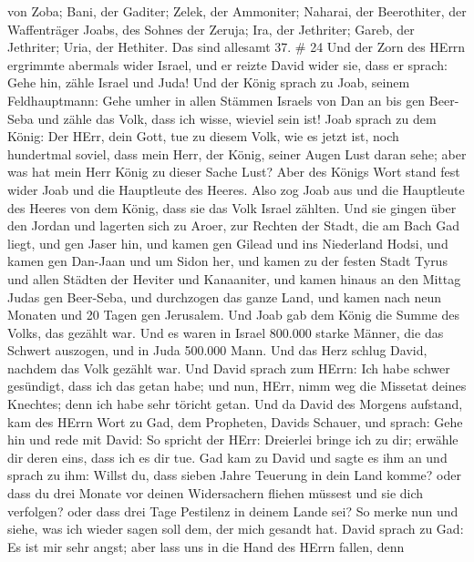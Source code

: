 von Zoba; Bani, der Gaditer;  Zelek, der Ammoniter;
Naharai, der Beerothiter, der Waffenträger Joabs, des Sohnes der Zeruja;
 Ira, der Jethriter; Gareb, der Jethriter; 
Uria, der Hethiter. Das sind allesamt 37. \# 24  Und der
Zorn des HErrn ergrimmte abermals wider Israel, und er reizte David
wider sie, dass er sprach: Gehe hin, zähle Israel und Juda! 
Und der König sprach zu Joab, seinem Feldhauptmann: Gehe umher in allen
Stämmen Israels von Dan an bis gen Beer-Seba und zähle das Volk, dass
ich wisse, wieviel sein ist!  Joab sprach zu dem König: Der
HErr, dein Gott, tue zu diesem Volk, wie es jetzt ist, noch hundertmal
soviel, dass mein Herr, der König, seiner Augen Lust daran sehe; aber
was hat mein Herr König zu dieser Sache Lust?  Aber des
Königs Wort stand fest wider Joab und die Hauptleute des Heeres. Also
zog Joab aus und die Hauptleute des Heeres von dem König, dass sie das
Volk Israel zählten.  Und sie gingen über den Jordan und
lagerten sich zu Aroer, zur Rechten der Stadt, die am Bach Gad liegt,
und gen Jaser hin,  und kamen gen Gilead und ins Niederland
Hodsi, und kamen gen Dan-Jaan und um Sidon her,  und kamen
zu der festen Stadt Tyrus und allen Städten der Heviter und Kanaaniter,
und kamen hinaus an den Mittag Judas gen Beer-Seba,  und
durchzogen das ganze Land, und kamen nach neun Monaten und 20 Tagen gen
Jerusalem.  Und Joab gab dem König die Summe des Volks, das
gezählt war. Und es waren in Israel 800.000 starke Männer, die das
Schwert auszogen, und in Juda 500.000 Mann.  Und das Herz
schlug David, nachdem das Volk gezählt war. Und David sprach zum HErrn:
Ich habe schwer gesündigt, dass ich das getan habe; und nun, HErr, nimm
weg die Missetat deines Knechtes; denn ich habe sehr töricht getan.
 Und da David des Morgens aufstand, kam des HErrn Wort zu
Gad, dem Propheten, Davids Schauer, und sprach:  Gehe hin
und rede mit David: So spricht der HErr: Dreierlei bringe ich zu dir;
erwähle dir deren eins, dass ich es dir tue.  Gad kam zu
David und sagte es ihm an und sprach zu ihm: Willst du, dass sieben
Jahre Teuerung in dein Land komme? oder dass du drei Monate vor deinen
Widersachern fliehen müssest und sie dich verfolgen? oder dass drei Tage
Pestilenz in deinem Lande sei? So merke nun und siehe, was ich wieder
sagen soll dem, der mich gesandt hat.  David sprach zu Gad:
Es ist mir sehr angst; aber lass uns in die Hand des HErrn fallen, denn

